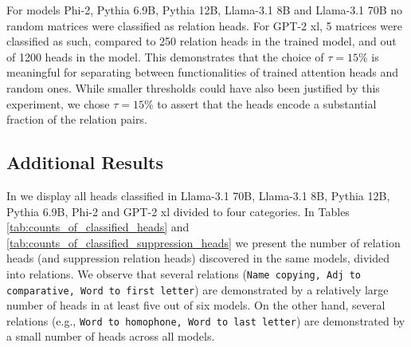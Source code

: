 \documentclass[11pt]{article}
\newcommand{\llamaThreeSeventyB}{Llama-3.1 70B}
\newcommand{\llamaThreeEightB}{Llama-3.1 8B}
\newcommand{\PHI}{Phi-2}
\newcommand{\PythiaTwelveB}{Pythia 12B}
\newcommand{\PythiaSevenB}{Pythia 6.9B}
\newcommand{\GPTxl}{GPT-2 xl}
\begin{document}
For models \PHI{}, \PythiaSevenB{}, \PythiaTwelveB{}, \llamaThreeEightB{} and \llamaThreeSeventyB{} no random matrices were classified as relation heads. For \GPTxl{}, 5 matrices were classified as such, compared to 250 relation heads in the trained model, and out of 1200 heads in the model.
This demonstrates that the choice of $\tau=15\%$ is meaningful for separating between functionalities of trained attention heads and random ones. 
While smaller thresholds could have also been justified by this experiment, we chose $\tau=15\%$ to assert that the heads encode a substantial fraction of the relation pairs.


\subsection{Additional Results}
In  we display all heads classified in \llamaThreeSeventyB{}, \llamaThreeEightB{}, \PythiaTwelveB{}, \PythiaSevenB{}, \PHI{} and \GPTxl{} divided to four categories.
In Tables \ref{tab:counts_of_classified_heads} and \ref{tab:counts_of_classified_suppression_heads} we present the number of relation heads (and suppression relation heads) discovered in the same models, divided into relations. We observe that several relations (\texttt{Name copying, Adj to comparative, Word to first letter}) are demonstrated by a relatively large number of heads in at least five out of six models. On the other hand, several relations (e.g., \texttt{Word to homophone, Word to last letter}) are demonstrated by a small number of heads across all models.
\end{document}
